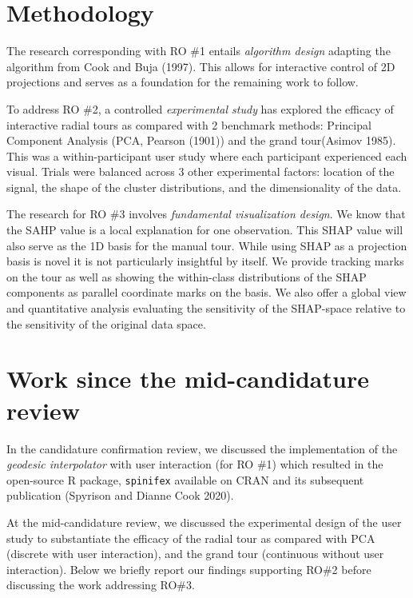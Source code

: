 \documentclass[
  11,
]{article}
\begin{document}
\hypertarget{methodology}{%
\section{Methodology}\label{methodology}}

The research corresponding with RO \#1 entails \emph{algorithm design} adapting the algorithm from Cook and Buja (1997). This allows for interactive control of 2D projections and serves as a foundation for the remaining work to follow.

To address RO \#2, a controlled \emph{experimental study} has explored the efficacy of interactive radial tours as compared with 2 benchmark methods: Principal Component Analysis (PCA, Pearson (1901)) and the grand tour(Asimov 1985). This was a within-participant user study where each participant experienced each visual. Trials were balanced across 3 other experimental factors: location of the signal, the shape of the cluster distributions, and the dimensionality of the data.

The research for RO \#3 involves \emph{fundamental visualization design}. We know that the SAHP value is a local explanation for one observation. This SHAP value will also serve as the 1D basis for the manual tour. While using SHAP as a projection basis is novel it is not particularly insightful by itself. We provide tracking marks on the tour as well as showing the within-class distributions of the SHAP components as parallel coordinate marks on the basis. We also offer a global view and quantitative analysis evaluating the sensitivity of the SHAP-space relative to the sensitivity of the original data space.

\hypertarget{work-since-the-mid-candidature-review}{%
\section{Work since the mid-candidature review}\label{work-since-the-mid-candidature-review}}

In the candidature confirmation review, we discussed the implementation of the \emph{geodesic interpolator} with user interaction (for RO \#1) which resulted in the open-source R package, \texttt{spinifex} available on CRAN and its subsequent publication (Spyrison and Dianne Cook 2020).

At the mid-candidature review, we discussed the experimental design of the user study to substantiate the efficacy of the radial tour as compared with PCA (discrete with user interaction), and the grand tour (continuous without user interaction). Below we briefly report our findings supporting RO\#2 before discussing the work addressing RO\#3.
\end{document}

